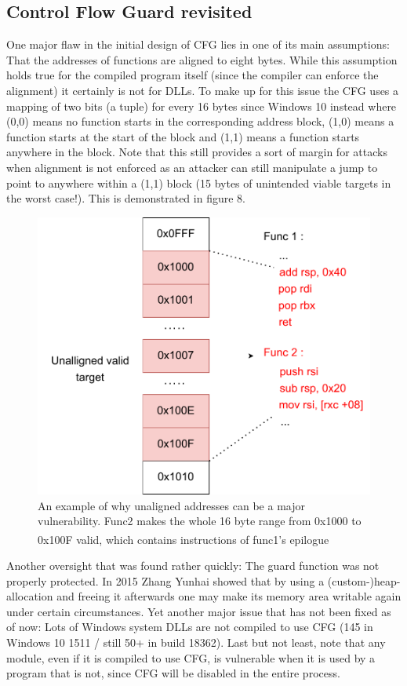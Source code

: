 \documentclass[10pt,twocolumn,a4paper]{article}
\begin{document}
\subsection{Control Flow Guard revisited}
One major flaw in the initial design of CFG lies in one of its main assumptions: That the addresses of functions are aligned to eight bytes.
While this assumption holds true for the compiled program itself (since the compiler can enforce the alignment) it certainly is not for DLLs.
To make up for this issue the CFG uses a mapping of two bits (a tuple) for every 16 bytes since Windows 10 instead where (0,0) means no function starts in the corresponding address block, (1,0) means a function starts at the start of the block and (1,1) means a function starts anywhere in the block.
Note that this still provides a sort of margin for attacks when alignment is not enforced as an attacker can still manipulate a jump to point to anywhere within a (1,1) block (15 bytes of unintended viable targets in the worst case!).
This is demonstrated in figure 8.
\begin{figure}[h]
	\includegraphics[keepaspectratio,width=\linewidth]{fig/unallignedcode}
	\caption{An example of why unaligned addresses can be a major vulnerability. Func2 makes the whole 16 byte range from 0x1000 to 0x100F valid, which contains instructions of func1's epilogue\textsuperscript{\cite{cfgexplore}}}
\end{figure}\newline
Another oversight that was found rather quickly: The guard function was not properly protected.
In 2015 Zhang Yunhai showed that by using a (custom-)heap-allocation and freeing it afterwards one may make its memory area writable again under certain circumstances\cite{cfgbypass}.
Yet another major issue that has not been fixed as of now:
Lots of Windows system DLLs are not compiled to use CFG (145 in Windows 10 1511 / still 50+ in build 18362)\cite{cfgbypass2}.
Last but not least, note that any module, even if it is compiled to use CFG, is vulnerable when it is used by a program that is not, since CFG will be disabled in the entire process.
\end{document}
